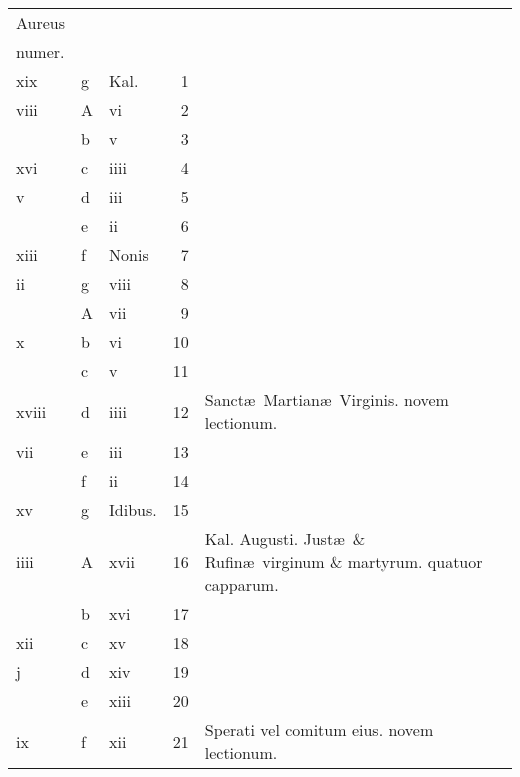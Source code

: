 \documentclass[openany]{book}
\begin{document}
\begin{center}
\begin{tabular}{l | l | l | r | l r}
\color{Red}Aureus & & & & \color{Red} \\
\color{Red}numer. & & & & \color{Red} \\
\color{Red} xix & g & \color{Red} Kal. & 1 & & \color{Red} \\
\color{Red} viii & \color{Red} A & \color{Red} vi & 2 & & \color{Red} \\
\color{Red}  & b & \color{Red} v & 3 & & \color{Red} \\
\color{Red} xvi & c & \color{Red} iiii & 4 & & \color{Red} \\
\color{Red} v & d & \color{Red} iii & 5 & & \color{Red} \\
\color{Red}  & e & \color{Red} ii & 6 & & \color{Red} \\
\color{Red} xiii & f & Nonis & 7 & & \color{Red} \\
\color{Red} ii & g & \color{Red} viii & 8 & & \color{Red} \\
\color{Red}  & \color{Red} A & \color{Red} vii & 9 & & \color{Red} \\
\color{Red} x & b & \color{Red} vi & 10 & & \color{Red} \\
\color{Red}  & c & \color{Red} v & 11 & & \color{Red} \\
\color{Red} xviii & d & \color{Red} iiii & 12 & Sanct\ae \ Martian\ae \ Virginis. \color{Red} novem lectionum. & \color{Red} \\
\color{Red} vii & e & \color{Red} iii & 13 & & \color{Red} \\
\color{Red}  & f & \color{Red} ii & 14 & & \color{Red} \\
\color{Red} xv & g & Idibus. & 15 & & \color{Red} \\
\color{Red} iiii & \color{Red} A & \color{Red} xvii & 16 & \color{Red} Kal. Augusti. \color{black} Just\ae \ \& Rufin\ae \ virginum \& martyrum. \color{Red} quatuor capparum. & \color{Red} \\
\color{Red}  & b & \color{Red} xvi & 17 & & \color{Red} \\
\color{Red} xii & c & \color{Red} xv & 18 & \color{Red} \\
\color{Red} j & d & \color{Red} xiv & 19 & & \color{Red} \\
\color{Red}  & e & \color{Red} xiii & 20 & & \color{Red} \\
\color{Red} ix & f & \color{Red} xii & 21 & Sperati vel comitum eius. \color{Red} novem lectionum. & \color{Red} \\

\end{tabular}
\end{center}
\end{document}
